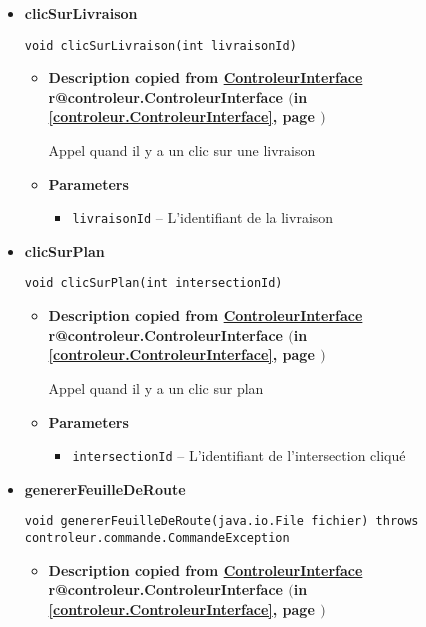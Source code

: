 \documentclass[11pt,a4paper]{report}
\makeatletter
\newcommand{\refdefined}[1]{
\expandafter\ifx\csname r@#1\endcsname\relax
\relax\else
{$($in \ref{#1}, page \pageref{#1}$)$}\fi}
\makeatother
\begin{document}
{{{{{\begin{itemize}
{\begin{itemize}
{Appel lors d'un clic sur Rétablir
}
\end{itemize}
}%
\item{ 
\hypertarget{controleur.Controleur.clicSurLivraison(int)}{{\bf  clicSurLivraison}\\}
\begin{lstlisting}[frame=none]
void clicSurLivraison(int livraisonId)\end{lstlisting} %
\begin{itemize}
\item{
{\bf  Description copied from \hyperlink{controleur.ControleurInterface}{ControleurInterface}{\small \refdefined{controleur.ControleurInterface}} }

Appel quand il y a un clic sur une livraison
}
\item{
{\bf  Parameters}
  \begin{itemize}
   \item{
\texttt{livraisonId} -- L'identifiant de la livraison}
  \end{itemize}
}%
\end{itemize}
}%
\item{ 
\hypertarget{controleur.Controleur.clicSurPlan(int)}{{\bf  clicSurPlan}\\}
\begin{lstlisting}[frame=none]
void clicSurPlan(int intersectionId)\end{lstlisting} %
\begin{itemize}
\item{
{\bf  Description copied from \hyperlink{controleur.ControleurInterface}{ControleurInterface}{\small \refdefined{controleur.ControleurInterface}} }

Appel quand il y a un clic sur plan
}
\item{
{\bf  Parameters}
  \begin{itemize}
   \item{
\texttt{intersectionId} -- L'identifiant de l'intersection cliqué}
  \end{itemize}
}%
\end{itemize}
}%
\item{ 
\hypertarget{controleur.Controleur.genererFeuilleDeRoute(java.io.File)}{{\bf  genererFeuilleDeRoute}\\}
\begin{lstlisting}[frame=none]
void genererFeuilleDeRoute(java.io.File fichier) throws controleur.commande.CommandeException\end{lstlisting} %
\begin{itemize}
\item{
{\bf  Description copied from \hyperlink{controleur.ControleurInterface}{ControleurInterface}{\small \refdefined{controleur.ControleurInterface}} }

}
\end{itemize}}
\end{itemize}}}}}}
\end{document}
